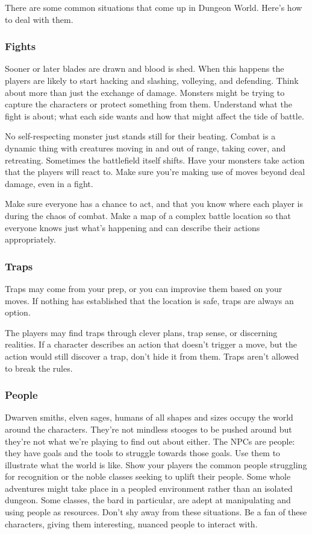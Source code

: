  There are some common situations that come up in Dungeon World. Here's how to deal with them.
\subsubsection{Fights}


 Sooner or later blades are drawn and blood is shed. When this happens the players are likely to start hacking and slashing, volleying, and defending. Think about more than just the exchange of damage. Monsters might be trying to capture the characters or protect something from them. Understand what the fight is about; what each side wants and how that might affect the tide of battle.


 No self-respecting monster just stands still for their beating. Combat is a dynamic thing with creatures moving in and out of range, taking cover, and retreating. Sometimes the battlefield itself shifts. Have your monsters take action that the players will react to. Make sure you're making use of moves beyond deal damage, even in a fight.


 Make sure everyone has a chance to act, and that you know where each player is during the chaos of combat. Make a map of a complex battle location so that everyone knows just what's happening and can describe their actions appropriately.
\subsubsection{Traps}


 Traps may come from your prep, or you can improvise them based on your moves. If nothing has established that the location is safe, traps are always an option.


 The players may find traps through clever plans, trap sense, or discerning realities. If a character describes an action that doesn't trigger a move, but the action would still discover a trap, don't hide it from them. Traps aren't allowed to break the rules.
\subsubsection{People}


 Dwarven smiths, elven sages, humans of all shapes and sizes occupy the world around the characters. They're not mindless stooges to be pushed around but they're not what we're playing to find out about either. The NPCs are people: they have goals and the tools to struggle towards those goals. Use them to illustrate what the world is like. Show your players the common people struggling for recognition or the noble classes seeking to uplift their people. Some whole adventures might take place in a peopled environment rather than an isolated dungeon. Some classes, the bard in particular, are adept at manipulating and using people as resources. Don't shy away from these situations. Be a fan of these characters, giving them interesting, nuanced people to interact with.


